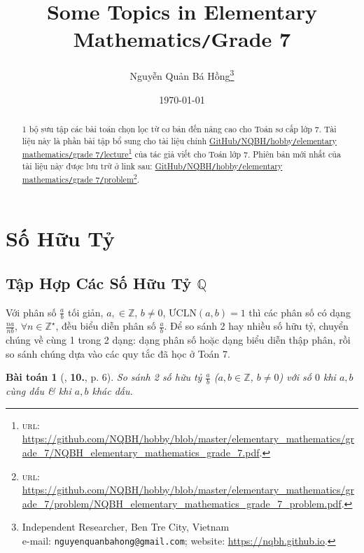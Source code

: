 \documentclass{article}
\title{Some Topics in Elementary Mathematics\texttt{/}Grade 7}
\author{Nguyễn Quản Bá Hồng\footnote{Independent Researcher, Ben Tre City, Vietnam\\e-mail: \texttt{nguyenquanbahong@gmail.com}; website: \url{https://nqbh.github.io}.}}
\date{\today}
\numberwithin{equation}{section}
\newtheorem{baitoan}{Bài toán}[section]
\begin{document}
\maketitle
\begin{abstract}
	1 bộ sưu tập các bài toán chọn lọc từ cơ bản đến nâng cao cho Toán sơ cấp lớp 7. Tài liệu này là phần bài tập bổ sung cho tài liệu chính \href{https://github.com/NQBH/hobby/blob/master/elementary_mathematics/grade_7/NQBH_elementary_mathematics_grade_7.pdf}{GitHub\texttt{/}NQBH\texttt{/}hobby\texttt{/}elementary mathematics\texttt{/}grade 7\texttt{/}lecture}\footnote{\textsc{url}: \url{https://github.com/NQBH/hobby/blob/master/elementary_mathematics/grade_7/NQBH_elementary_mathematics_grade_7.pdf}.} của tác giả viết cho Toán lớp 7. Phiên bản mới nhất của tài liệu này được lưu trữ ở link sau: \href{https://github.com/NQBH/hobby/blob/master/elementary_mathematics/grade_7/problem/NQBH_elementary_mathematics_grade_7_problem.pdf}{GitHub\texttt{/}NQBH\texttt{/}hobby\texttt{/}elementary mathematics\texttt{/}grade 7\texttt{/}problem}\footnote{\textsc{url}: \url{https://github.com/NQBH/hobby/blob/master/elementary_mathematics/grade_7/problem/NQBH_elementary_mathematics_grade_7_problem.pdf}.}.
\end{abstract}
\tableofcontents
\newpage


\section{Số Hữu Tỷ}

\subsection{Tập Hợp Các Số Hữu Tỷ $\mathbb{Q}$}
Với phân số $\frac{a}{b}$ tối giản, $a,\in\mathbb{Z}$, $b\ne 0$, $\mbox{ƯCLN}(a,b) = 1$ thì các phân số có dạng $\frac{na}{nb}$, $\forall n\in\mathbb{Z}^\star$, đều biểu diễn phân số $\frac{a}{b}$. Để so sánh 2 hay nhiều số hữu tỷ, chuyển chúng về cùng 1 trong 2 dạng: dạng phân số hoặc dạng biểu diễn thập phân, rồi so sánh chúng dựa vào các quy tắc đã học ở Toán 7.

\begin{baitoan}[\cite{Trong_Toan_7_2022}, \textbf{10.}, p. 6]
	So sánh 2 số hữu tỷ $\frac{a}{b}$ ($a,b\in\mathbb{Z}$, $b\ne 0$) với số $0$ khi $a,b$ cùng dấu \& khi $a,b$ khác dấu.
\end{baitoan}
\end{document}
